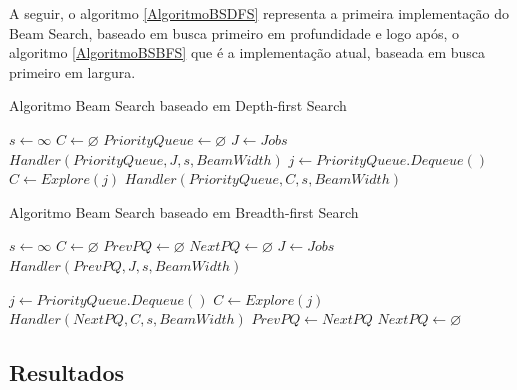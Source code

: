 \documentclass[a4paper,12pt]{article}
\begin{document}
A seguir, o algoritmo \ref{AlgoritmoBSDFS} representa a primeira implementação do Beam Search, baseado 
em busca primeiro em profundidade e logo após, o algoritmo \ref{AlgoritmoBSBFS} que é a implementação atual, 
baseada em busca primeiro em largura.


\begin{algorithm}[H]
\caption{Algoritmo Beam Search baseado em Depth-first Search} \label{AlgoritmoBSDFS}
\begin{algorithmic}[1]
\State $s \gets \infty$                       
\State $C \gets \varnothing$                        
\State $PriorityQueue \gets \varnothing$  
\State $J \gets Jobs$
\State $\textit{Handler}(PriorityQueue, J, s, BeamWidth)$
\State $j \gets PriorityQueue.\textit{Dequeue}()$
\State $C \gets \textit{Explore}(j)$                
\State $\textit{Handler}(PriorityQueue, C, s, BeamWidth)$
\EndWhile
\EndProcedure
\end{algorithmic}
\end{algorithm}


\begin{algorithm}[H]
\caption{Algoritmo Beam Search baseado em Breadth-first Search} \label{AlgoritmoBSBFS}
\begin{algorithmic}[1]
\State $s \gets \infty$                       
\State $C \gets \varnothing$                        
\State $PrevPQ \gets \varnothing$                   
\State $NextPQ \gets \varnothing$                   
\State $J \gets Jobs$
\State $\textit{Handler}(PrevPQ, J, s, BeamWidth)$

		\State $j \gets PriorityQueue.\textit{Dequeue}()$
		\State $C \gets \textit{Explore}(j)$                
		\State $\textit{Handler}(NextPQ, C, s, BeamWidth)$
	\EndWhile
	\State $PrevPQ \gets NextPQ$
	\State $NextPQ \gets \varnothing$
\EndWhile
\EndProcedure
\end{algorithmic}
\end{algorithm}




\subsection{Resultados}
\end{document}
